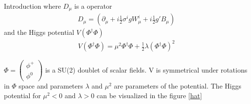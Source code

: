 \begin{chapter}{Introduction}
where $D_\mu$ is a operator 
 \begin{align}
D_\mu = \left(\partial_\mu+i\frac{1}{2}\sigma^igW^i_\mu+i\frac{1}{2} g' B_\mu \right) 
 \end{align}
and the Higgs potential  $V(\Phi^\dagger \Phi)$
\begin{align}
 V(\Phi^\dagger \Phi)=\mu^2 \Phi^\dagger \Phi +\frac{1}{2}  \lambda (\Phi^\dagger \Phi)^2     
\end{align}

 $\Phi=\left(\begin{array}{c}
 \phi^+ \\
\phi^0
\end{array} \right)  $ is a SU(2) doublet of  scalar fields. V is symmetrical under rotations in $\Phi$ space
and parameters  $\lambda $ and $\mu^2$ are  parameters of the potential. The Higgs potential for $\mu^2 <0$ and $\lambda>0$ can be visualized in the figure \ref{hat}




\end{chapter}
